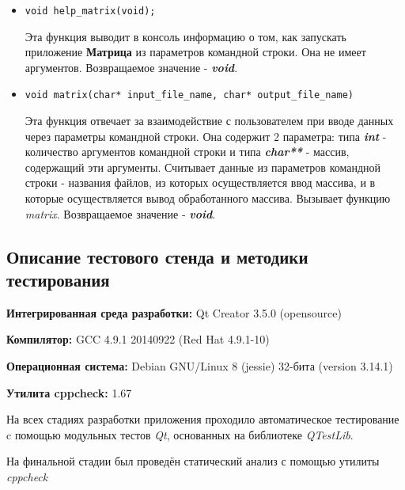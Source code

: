 \documentclass[12pt,a4paper]{report}
\begin{document}
\begin{enumerate}
\begin{itemize}
\item \verb-void help_matrix(void);-

Эта функция выводит в консоль информацию о том, как запускать приложение \textbf{Матрица} из параметров командной строки. Она не имеет аргументов. Возвращаемое значение - \textit{\textbf{void}}.
\end{itemize}

\begin{itemize}
\item \verb-void matrix(char* input_file_name, char* output_file_name)-

Эта функция отвечает за взаимодействие с пользователем при вводе данных через параметры командной строки. Она содержит 2 параметра: типа \textbf{\textit{int}} - количество аргументов командной строки и типа \textbf{\textit{char**}} - массив, содержащий эти аргументы. Считывает данные из параметров командной строки - названия файлов, из которых осуществляется ввод массива, и в которые осуществляется вывод обработанного массива. Вызывает функцию \textit{matrix}. Возвращаемое значение - \textit{\textbf{void}}.
\end{itemize}
\end{enumerate}
\subsection{Описание тестового стенда и методики тестирования}

\begin{flushleft}
\textbf{Интегрированная среда разработки:} Qt Creator 3.5.0 (opensource)

\textbf{Компилятор:} GCC 4.9.1 20140922 (Red Hat 4.9.1-10)

\textbf{Операционная система:} Debian GNU/Linux 8 (jessie) 32-бита (version 3.14.1)

\textbf{Утилита cppcheck:} 1.67
\end{flushleft}

На всех стадиях разработки приложения проходило автоматическое тестирование c помощью модульных тестов \textit{Qt}, основанных на библиотеке  \textit{QTestLib}.

На финальной стадии был проведён статический анализ с помощью утилиты \textit{cppcheck}%
\end{document}
